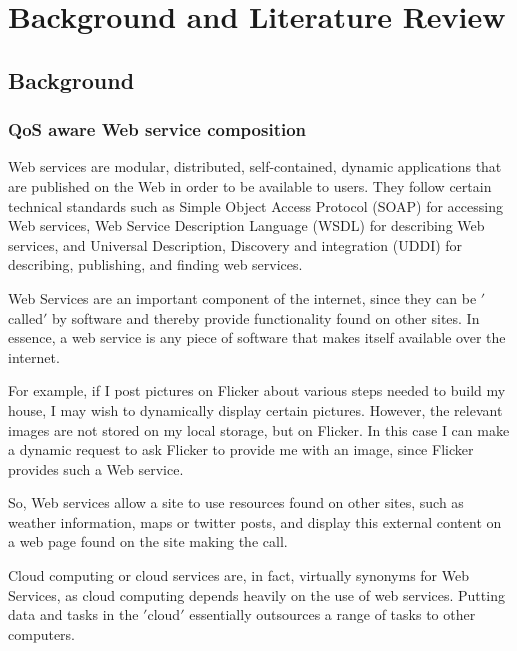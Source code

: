 \chapter{Background and Literature Review}\label{C:ex}
\section{Background}
\subsection{QoS aware Web service composition}

Web services \cite{24} are modular, distributed, self-contained, dynamic applications that are published on the Web in order to be available to users. They follow certain technical standards such as Simple Object Access Protocol (SOAP) \cite{24} for accessing Web services, Web Service Description Language (WSDL) \cite{24} for describing Web services, and Universal Description, Discovery and integration (UDDI) \cite{25} for describing, publishing, and finding web services. \par

Web Services are an important component of the internet, since they can be $'$called$'$ by software and thereby provide functionality found on other sites. In essence, a web service is any piece of software that makes itself available over the internet.\par

For example, if I post pictures on Flicker about various steps needed to build my house, I may wish to dynamically display certain pictures. However, the relevant images are not stored on my local storage, but on Flicker. In this case I can make a dynamic request to ask Flicker to provide me with an image, since Flicker provides such a Web service.\par

So, Web services allow a site to use resources found on other sites, such as weather information, maps or twitter posts, and display this external content on a web page found on the site making the call.\par

Cloud computing or cloud services are, in fact, virtually synonyms for Web Services, as cloud computing depends heavily on the use of web services. Putting data and tasks in the $'$cloud$'$ essentially outsources a range of tasks to other computers.\par


